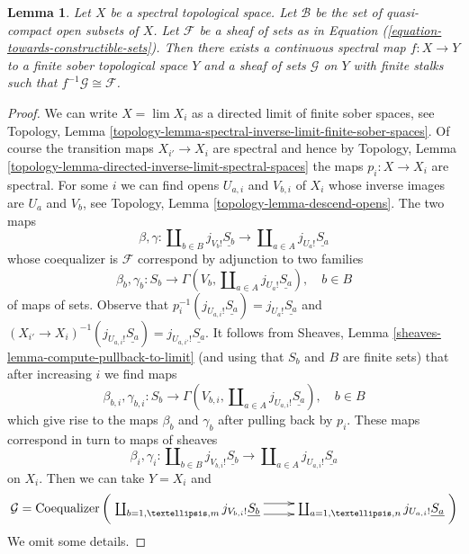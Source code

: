 \documentclass{stacks-project}
\theoremstyle{plain}
\newtheorem{lemma}[subsection]{Lemma}
\theoremstyle{definition}
\theoremstyle{remark}
\numberwithin{equation}{subsection}
\def\lim{\mathop{\mathrm{lim}}\nolimits}
\begin{document}
\begin{lemma}
\label{lemma-constructible-comes-from-finite}
Let $X$ be a spectral topological space. Let $\mathcal{B}$ be
the set of quasi-compact open subsets of $X$.
Let $\mathcal{F}$ be a sheaf of sets as in
Equation (\ref{equation-towards-constructible-sets}).
Then there exists a continuous spectral map $f : X \to Y$
to a finite sober topological space $Y$ and a sheaf
of sets $\mathcal{G}$ on $Y$ with finite stalks
such that $f^{-1}\mathcal{G} \cong \mathcal{F}$.
\end{lemma}

\begin{proof}
We can write $X = \lim X_i$ as a directed limit
of finite sober spaces, see Topology, Lemma
\ref{topology-lemma-spectral-inverse-limit-finite-sober-spaces}.
Of course the transition maps $X_{i'} \to X_i$ are spectral and hence
by Topology, Lemma \ref{topology-lemma-directed-inverse-limit-spectral-spaces}
the maps $p_i : X \to X_i$ are spectral.
For some $i$ we can find opens $U_{a, i}$ and $V_{b, i}$
of $X_i$ whose inverse images are $U_a$ and $V_b$, see
Topology, Lemma \ref{topology-lemma-descend-opens}.
The two maps
$$
\beta, \gamma :
\coprod\nolimits_{b \in B} j_{V_b!}\underline{S_b}
\longrightarrow
\coprod\nolimits_{a \in A} j_{U_a!}\underline{S_a}
$$
whose coequalizer is $\mathcal{F}$ correspond by adjunction to two families
$$
\beta_b, \gamma_b :
S_b
\longrightarrow
\Gamma(V_b, \coprod\nolimits_{a \in A} j_{U_a!}\underline{S_a}), \quad
b \in B
$$
of maps of sets. Observe that
$p_i^{-1}(j_{U_{a, i}!}\underline{S_a}) = j_{U_a!}\underline{S_a}$
and $(X_{i'} \to X_i)^{-1}(j_{U_{a, i}!}\underline{S_a}) =
j_{U_{a, i'}!}\underline{S_a}$. It follows from
Sheaves, Lemma \ref{sheaves-lemma-compute-pullback-to-limit}
(and using that $S_b$ and $B$ are finite sets) that
after increasing $i$ we find maps
$$
\beta_{b, i}, \gamma_{b, i} :
S_b
\longrightarrow
\Gamma(V_{b, i}, \coprod\nolimits_{a \in A} j_{U_{a, i}!}\underline{S_a})
, \quad b \in B
$$
which give rise to the maps $\beta_b$ and $\gamma_b$ after pulling
back by $p_i$. These maps correspond in turn to maps of sheaves
$$
\beta_i, \gamma_i :
\coprod\nolimits_{b \in B} j_{V_{b, i}!}\underline{S_b}
\longrightarrow
\coprod\nolimits_{a \in A} j_{U_{a, i}!}\underline{S_a}
$$
on $X_i$. Then we can take $Y = X_i$ and
$$
\mathcal{G} =
\text{Coequalizer}\left(
\xymatrix{
\coprod\nolimits_{b = 1, \ldots, m} j_{V_{b, i}!}\underline{S_b}
\ar@<1ex>[r] \ar@<-1ex>[r] &
\coprod\nolimits_{a = 1, \ldots, n} j_{U_{a, i}!}\underline{S_a}
}
\right)
$$
We omit some details.
\end{proof}
\end{document}
